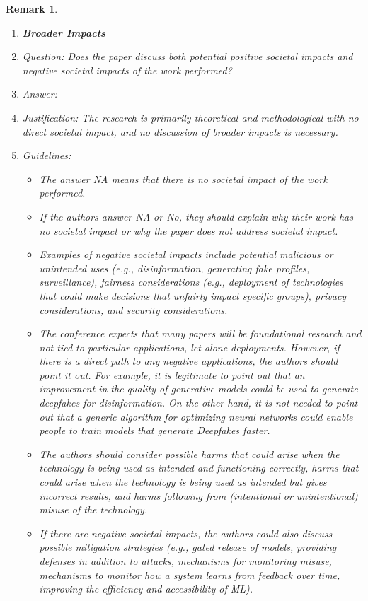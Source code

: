 \documentclass{article}
\newtheorem{remark}{Remark}
\begin{document}
\begin{remark}
\begin{enumerate}
\item {\bf Broader Impacts}
    \item[] Question: Does the paper discuss both potential positive societal impacts and negative societal impacts of the work performed?
    \item[] Answer: \answerNA{}
    \item[] Justification: The research is primarily theoretical and methodological with no direct societal impact, and no discussion of broader impacts is necessary.
    \item[] Guidelines:
    \begin{itemize}
        \item The answer NA means that there is no societal impact of the work performed.
        \item If the authors answer NA or No, they should explain why their work has no societal impact or why the paper does not address societal impact.
        \item Examples of negative societal impacts include potential malicious or unintended uses (e.g., disinformation, generating fake profiles, surveillance), fairness considerations (e.g., deployment of technologies that could make decisions that unfairly impact specific groups), privacy considerations, and security considerations.
        \item The conference expects that many papers will be foundational research and not tied to particular applications, let alone deployments. However, if there is a direct path to any negative applications, the authors should point it out. For example, it is legitimate to point out that an improvement in the quality of generative models could be used to generate deepfakes for disinformation. On the other hand, it is not needed to point out that a generic algorithm for optimizing neural networks could enable people to train models that generate Deepfakes faster.
        \item The authors should consider possible harms that could arise when the technology is being used as intended and functioning correctly, harms that could arise when the technology is being used as intended but gives incorrect results, and harms following from (intentional or unintentional) misuse of the technology.
        \item If there are negative societal impacts, the authors could also discuss possible mitigation strategies (e.g., gated release of models, providing defenses in addition to attacks, mechanisms for monitoring misuse, mechanisms to monitor how a system learns from feedback over time, improving the efficiency and accessibility of ML).
    \end{itemize}
    

\end{enumerate}
\end{remark}
\end{document}
